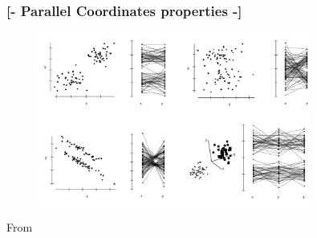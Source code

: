 \documentclass[xcolor=x11names,compress, aspectratio=169]{beamer}
\renewcommand{\(}{\begin{columns}}
\renewcommand{\)}{\end{columns}}
\newcommand{\<}[1]{\begin{column}{#1}}
\renewcommand{\>}{\end{column}}
\begin{document}
\begin{frame}
\begin{center}
\begin{enumerate}
\end{enumerate}
\end{center}
\end{frame}


\begin{frame} %
\frametitle{\textcolor{brique}{[-  \textbf{Parallel Coordinates properties}   -]}}
\begin{figure}[h]
\includegraphics[width = 0.8\textwidth]{ParallelCoordinatesGroups.pdf}
\end{figure}
\textcolor{gris}{From  \cite{Unwin2006}}
\end{frame}
\end{document}
